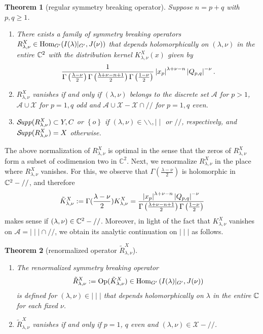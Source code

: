\documentclass[reqno,12pt]{pja00} %
\newtheorem{theorem}{Theorem}[section]
\newcommand{\Hom}{\mbox{\normalfont Hom}}
\newcommand{\Supp}{\mathcal{S}\!{\it upp}}
\theoremstyle{definition}
\theoremstyle{exampstyle} \newtheorem{examp}[theorem]{Theorem}
\newcommand{\Op}{\mbox{\normalfont Op}}
\renewcommand{\Q}{Q_{p,q}}
\let\setminus-
\begin{document}
\begin{theorem}[regular symmetry breaking operator]\label{thm:regular}
	Suppose $n=p+q$ with $p,q\ge1$.
	\begin{enumerate}[(1)]
		\item There exists a family of symmetry breaking operators $R_{\lambda,\nu}^X\in\Hom_{G'}(I(\lambda)\kern-0.1cm\mid_{G'},J(\nu))$ that depends 
			holomorphically on $(\lambda,\nu)$ in the entire $\mathbb{C}^2$ with the distribution kernel
 $K_{\lambda,\nu}^X(x)$ given by
\begin{equation*}
		\frac{1}{\Gamma\left( \frac{\lambda-\nu}{2}\right)\Gamma\left( \frac{\lambda+\nu-n+1}{2}\right)\Gamma\left( \frac{1-\nu}{2}   \right)}\myabs{x_p}^{\lambda+\nu-n}
		\myabs{\Q}^{-\nu}.
\end{equation*}
\item 
	$R^X_{\lambda,\nu}$ vanishes if and only if $(\lambda,\nu)$ belongs to the discrete set $\mathcal{A}$ for $p>1$, $\mathcal{A}\cup\mathcal{X}$ for $p=1,q$ odd
	and $\mathcal{A}\cup\mathcal{X}-\mathcal{X}\cap//$ for $p=1,q$ even.
\item 
	$\Supp(R_{\lambda,\nu}^X)\subset Y,C$ or $\left\{ o \right\}$ if $(\lambda,\nu)\in\backslash\backslash,\mid\mid$ or $//$, respectively, and $\Supp(R_{\lambda,\nu}^X)=X$
	otherwise.
	\end{enumerate}
\end{theorem}
The above normalization of $R^X_{\lambda,\nu}$ is optimal in the sense that
the zeros of $R^X_{\lambda,\nu}$ form a subset of codimension two in $\mathbb C^2$.
Next, we renormalize $R_{\lambda,\nu}^X$ in the place where
$R_{\lambda,\nu}^X$ vanishes. For this, we observe
that $\Gamma\left( \frac{\lambda-\nu}{2} \right)$ is holomorphic in $\C^2\setminus //$,
 and therefore
\begin{equation*}
	\tilde{K}_{\lambda,\nu}^X:=\Gamma( \frac{\lambda-\nu}{2})K_{\lambda,\nu}^X
	=\frac{\myabs{x_p}^{\lambda+\nu-n}\myabs{\Q}^{-\nu}}{\Gamma\left( \frac{\lambda+\nu-n+1}{2} \right)\Gamma\left( \frac{1-\nu}{2} \right)}
\end{equation*}
makes sense if $(\lambda,\nu)\in\C^2\setminus //$. 
Moreover, in light of the fact that $K_{\lambda,\nu}^X$ vanishes 
on $\mathcal{A}=\mid\mid\mid\cap//$,
we obtain its analytic continuation on $\mid\mid\mid$ as follows.
\begin{theorem}[renormalized operator $\tilde{R}_{\lambda,\nu}^X$]
	\begin{enumerate}[(1)]
		\item The renormalized symmetry breaking operator
\begin{equation*}
	\tilde{R}_{\lambda,\nu}^X:=\Op(\tilde{K}_{\lambda,\nu}^X)\in\Hom_{G'}\left( I(\lambda)\kern-0.1cm\mid_{G'},J(\nu) \right)
\end{equation*}
is defined for $(\lambda,\nu)\in\mid\mid\mid$ that depends holomorphically 
			on $\lambda$ in the entire $\mathbb{C}$ for each fixed $\nu$.
		\item $\tilde{R}^X_{\lambda,\nu}$ vanishes if and only if $p=1$, $q$ even and $(\lambda,\nu)\in\mathcal{X}\setminus//$.
	\end{enumerate}
	\label{thm:X2}
\end{theorem}
\end{document}
